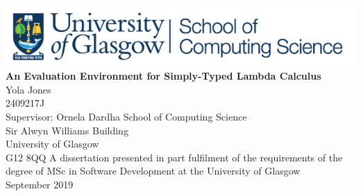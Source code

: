 \documentclass[a4paper,11pt]{report}
\begin{document}
\begin{titlepage}
	\centering
	\includegraphics[scale=0.9]{images/cslogo.png} %
	\vfill
	{\bfseries\Huge
		An Evaluation Environment for Simply-Typed Lambda Calculus\\
	}
	\vskip2cm
	{\huge
		Yola Jones\\
	}
	{\LARGE
		\vskip0.5cm
		2409217J\\
		\vskip0.75cm
		Supervisor: Ornela Dardha
	}
	\vskip1cm
	{\large
		School of Computing Science\\
		Sir Alwyn Williams Building\\
		University of Glasgow\\
		G12 8QQ
	}
	\vskip2cm
	{\Large
		\vskip1cm
		A dissertation presented in part fulfilment of the requirements of the degree of MSc in Software Development at the University of Glasgow\\
		\vskip1cm
		September 2019\\
	}  
	\vfill
	
	
\end{titlepage}
\thispagestyle{empty}
\end{document}
